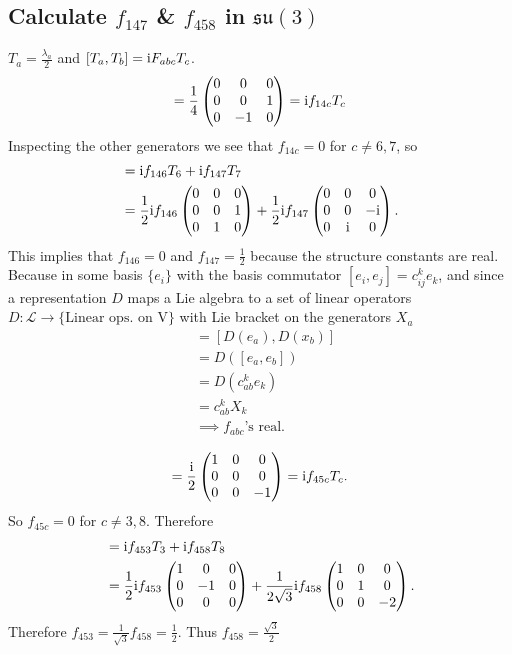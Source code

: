 \documentclass[main.tex]{subfiles}
\begin{document}
\subsection{Calculate $f_{147}$ \& $f_{458}$ in $\mathfrak{su}(3)$}
$T_a=\frac{\lambda_a}{2}$ and $[T_a,T_b]=\mathrm{i} F_{abc}T_c$.
\begin{equation}
[T_1,T_4]=\frac{1}{4}\begin{pmatrix}0&0&0\\0&0&1\\0&-1&0\end{pmatrix}=\img f_{14c}T_c
\end{equation}
Inspecting the other generators we see that $f_{14c}=0$ for $c\neq6,7$, so
\begin{align}
[T_1,T_4]&=\img f_{146}T_6 + \img f_{147}T_7\\
&=\frac{1}{2}\img f_{146}\begin{pmatrix}0&0&0\\0&0&1\\0&1&0\end{pmatrix}+\frac{1}{2}\img f_{147}\begin{pmatrix}0&0&0\\0&0&-\img\\0&\img&0\end{pmatrix}.
\end{align}
This implies that $f_{146}=0$ and $f_{147}=\frac{1}{2}$ because the structure constants are real. Because in some basis $\{e_i\}$ with the basis commutator $[e_i,e_j]=c^k_{ij}e_k$, and since a representation $D$ maps a Lie algebra to a set of linear operators $D:\mathcal{L}\rightarrow\{\text{Linear ops. on V}\}$ with Lie bracket on the generators $X_a$ 
\begin{align}
[X_a,X_b]&=[D(e_a),D(x_b)]\\
&=D([e_a,e_b])\\
&=D(c^k_{ab}e_k)\\
&=c^k_{ab}X_k\\
&\implies f_{abc}\text{'s real}.
\end{align}

\begin{equation}
[T_4,T_5]=\frac{\img}{2}\begin{pmatrix}1&0&0\\0&0&0\\0&0&-1\end{pmatrix}=\img f_{45c}T_c.
\end{equation}
So $f_{45c}=0$ for $c\neq3,8$. Therefore
\begin{align}
[T_4,T_5]&=\img f_{453}T_3 + \img f_{458}T_8\\
&=\frac{1}{2}\img f_{453}\begin{pmatrix}1&0&0\\0&-1&0\\0&0&0\end{pmatrix}+\frac{1}{2\sqrt{3}}\img f_{458}\begin{pmatrix}1&0&0\\0&1&0\\0&0&-2\end{pmatrix}.
\end{align}
Therefore $f_{453}=\frac{1}{\sqrt{3}}f_{458}=\frac{1}{2}$. Thus $f_{458}=\frac{\sqrt{3}}{2}$
\end{document}

